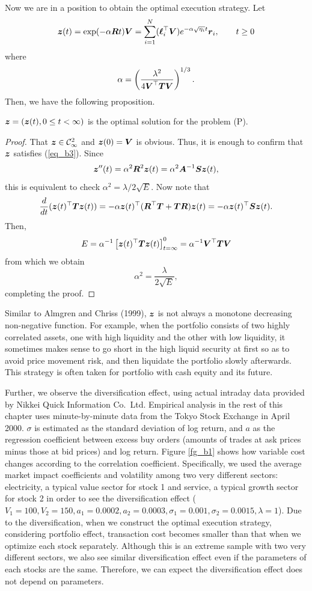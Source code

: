  Now we are in a position to obtain the optimal execution strategy.
 Let
\[ %
  \z(t) = \mbox{exp} (-\alpha \R t) \V
        = \sum_{i=1}^N (\l_i^\top \V) e^{-\alpha \sqrt{\eta_i} t} \r_i, \qquad t \geq 0
\] %
where
\[ %
  \alpha = \left( \frac{\lambda^2}{4\V^\top \T \V} \right)^{1/3}.
\] %
 Then, we have the following proposition.
\begin{proposition}\label{prop_b1}
 \quad $\mbox{\boldmath $z$}=(\mbox{\boldmath $z$}(t), 0\leq t<\infty)$ is the optimal solution for the problem (P).
\end{proposition}
\begin{proof}
 That $\mbox{\boldmath $z$} \in {\cal C}_\infty^2$ and $\mbox{\boldmath $z$}(0)=\mbox{\boldmath $V$}$ is obvious.
 Thus, it is enough to confirm that $\mbox{\boldmath $z$}$ satisfies (\ref{eq_b3}).
 Since
\[
  \mbox{\boldmath $z$}''(t) = \alpha^2 \mbox{\boldmath $R$}^2 \mbox{\boldmath $z$}(t) = \alpha^2 \mbox{\boldmath $A$}^{-1}\mbox{\boldmath $S$} \mbox{\boldmath $z$}(t),
\]
this is equivalent to check $\alpha^2 = \lambda /2\sqrt{E}$.
 Now note that
\[
 \frac{d }{d t} (\mbox{\boldmath $z$}(t)^\top \mbox{\boldmath $T$} \mbox{\boldmath $z$}(t))
  = - \alpha \mbox{\boldmath $z$}(t)^\top ( \mbox{\boldmath $R$}^\top \mbox{\boldmath $T$} + \mbox{\boldmath $T$} \mbox{\boldmath $R$} ) \mbox{\boldmath $z$}(t)
  = - \alpha \mbox{\boldmath $z$}(t)^\top \mbox{\boldmath $S$} \mbox{\boldmath $z$}(t).
\]
 Then,
\[
  E = \alpha^{-1} \left[ \mbox{\boldmath $z$}(t)^\top \mbox{\boldmath $T$} \mbox{\boldmath $z$}(t) \right]_{t=\infty}^0 = \alpha^{-1} \mbox{\boldmath $V$}^\top \mbox{\boldmath $T$} \mbox{\boldmath $V$}
\]
from which we obtain
\[
  \alpha^2 = \frac{\lambda}{2\sqrt{E}},
\]
completing the proof.
\end{proof}

\medskip

 Similar to Almgren and Chriss (1999),  $\mbox{\boldmath $z$}$ is not always a monotone decreasing non-negative function.  For example, when the portfolio consists of two highly correlated assets, one with high liquidity and the other with low liquidity, it sometimes makes sense to go short in the high liquid security at first so as to avoid price movement risk, and then liquidate the portfolio slowly afterwards.  This strategy is often taken for portfolio with cash equity and its future.

Further, we observe the diversification effect, using actual intraday data provided by Nikkei Quick Information Co.~Ltd.  Empirical analysis in the rest of this chapter uses minute-by-minute data from the Tokyo Stock Exchange in April 2000.  $\sigma$ is estimated as the standard deviation of log return, and $a$ as the regression coefficient between excess buy orders (amounts of trades at ask prices minus those at bid prices) and log return.  Figure \ref{fg_b1} shows how variable cost changes according to the correlation coefficient.  Specifically, we used the average market impact coefficients and volatility among two very different sectors: electricity, a typical value sector for stock 1 and service, a typical growth sector for stock 2 in order to see the diversification effect ($V_1=100, V_2=150, a_1=0.0002, a_2=0.0003, \sigma_1=0.001, \sigma_2=0.0015, \lambda=1$).  Due to the diversification, when we construct the optimal execution strategy, considering portfolio effect, transaction cost becomes smaller than that when we optimize each stock separately.  Although this is an extreme sample with two very different sectors, we also see similar diversification effect even if the parameters of each stocks are the same.  Therefore, we can expect the diversification effect does not depend on parameters.

